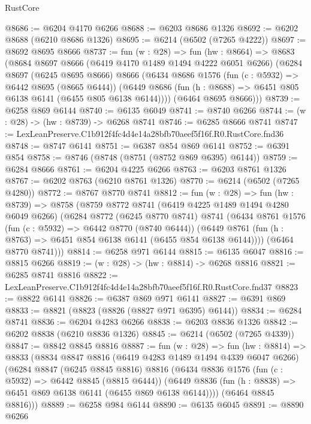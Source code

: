 \begin{lexlean}{RustCore}
\begin{coremodule}
@8686 := @6204 @4170 @6266
@8688 := @6203 @8686 @1326
@8692 := @6202 @8688 (@6210 @8686 @1326)
@8695 := @6214 (@6502 (@7265 @4222))
@8697 := @8692 @8695 @8666
@8737 := fun (w : @28) =>
  fun (hw : @8664) =>
  @8683
    (@8684
      @8697
      @8666
      (@6419 @4170 @1489 @1494 @4222 @6051 @6266)
      (@6284
        @8697
        (@6245 @8695 @8666)
        @8666
        (@6434
          @8686
          @1576
          (fun (c : @5932) => @6442 @8695 (@8665 @6444))
          (@6449 @8686 (fun (h : @8688) => @6451 @805 @6138 @6141 (@6455 @805 @6138 @6144))))
        (@6464 @8695 @8666)))
@8739 := @6258 @869 @6144
@8740 := @6135 @6049
@8741 := @8740 @6266
@8744 := (w : @28) -> (hw : @8739) -> @6268 @8741
@8746 := @6285 @8666 @8741
@8747 := LexLeanPreserve.C1b912f4fc4d4e14a28bfb70aeef5f16f.R0.RustCore.fnd36
@8748 := @8747 @6141
@8751 := @6387 @854 @869 @6141
@8752 := @6391 @854
@8758 := @8746 (@8748 (@8751 (@8752 @869 @6395) @6144))
@8759 := @6284 @8666
@8761 := @6204 @4225 @6266
@8763 := @6203 @8761 @1326
@8767 := @6202 @8763 (@6210 @8761 @1326)
@8770 := @6214 (@6502 (@7265 @4280))
@8772 := @8767 @8770 @8741
@8812 := fun (w : @28) =>
  fun (hw : @8739) =>
  @8758
    (@8759
      @8772
      @8741
      (@6419 @4225 @1489 @1494 @4280 @6049 @6266)
      (@6284
        @8772
        (@6245 @8770 @8741)
        @8741
        (@6434
          @8761
          @1576
          (fun (c : @5932) => @6442 @8770 (@8740 @6444))
          (@6449 @8761 (fun (h : @8763) => @6451 @854 @6138 @6141 (@6455 @854 @6138 @6144))))
        (@6464 @8770 @8741)))
@8814 := @6258 @971 @6144
@8815 := @6135 @6047
@8816 := @8815 @6266
@8819 := (w : @28) -> (hw : @8814) -> @6268 @8816
@8821 := @6285 @8741 @8816
@8822 := LexLeanPreserve.C1b912f4fc4d4e14a28bfb70aeef5f16f.R0.RustCore.fnd37
@8823 := @8822 @6141
@8826 := @6387 @869 @971 @6141
@8827 := @6391 @869
@8833 := @8821 (@8823 (@8826 (@8827 @971 @6395) @6144))
@8834 := @6284 @8741
@8836 := @6204 @4283 @6266
@8838 := @6203 @8836 @1326
@8842 := @6202 @8838 (@6210 @8836 @1326)
@8845 := @6214 (@6502 (@7265 @4339))
@8847 := @8842 @8845 @8816
@8887 := fun (w : @28) =>
  fun (hw : @8814) =>
  @8833
    (@8834
      @8847
      @8816
      (@6419 @4283 @1489 @1494 @4339 @6047 @6266)
      (@6284
        @8847
        (@6245 @8845 @8816)
        @8816
        (@6434
          @8836
          @1576
          (fun (c : @5932) => @6442 @8845 (@8815 @6444))
          (@6449 @8836 (fun (h : @8838) => @6451 @869 @6138 @6141 (@6455 @869 @6138 @6144))))
        (@6464 @8845 @8816)))
@8889 := @6258 @984 @6144
@8890 := @6135 @6045
@8891 := @8890 @6266

\end{coremodule}
\end{lexlean}
